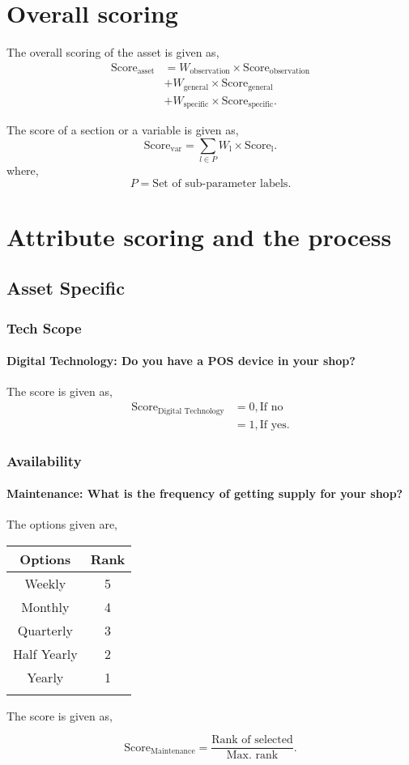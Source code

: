 \documentclass[oneside,twocolumn]{article}
\newcommand{\tsub}[2]{\text{#1}_{\text{#2}}}
\newcommand{\tsubb}[2]{#1_{\text{#2}}}
\newcommand{\dsub}[2]{\dfrac{\text{#1}}{\text{#2}}}
\newcommand{\singsel}[1]
{
	\[
		\tsub{Score}{#1} = \dsub{Rank of selected}{Max. rank}.
	\]
}
\newenvironment{ttable}
{
\begin{center}
\begin{tabular}{c|c}
\hline
}
{
\\ \hline
\end{tabular}
\end{center}
}
\begin{document}
\section{Overall scoring}
The overall scoring of the asset is given as,
\begin{align*}
	\tsub{Score}{asset} &= \tsubb{W}{observation} \times \tsub{Score}{observation} \\
	&+ \tsubb{W}{general} \times \tsub{Score}{general} \\
	&+ \tsubb{W}{specific} \times \tsub{Score}{specific}.
\end{align*}

The score of a section or a variable is given as,
\[
	\tsub{Score}{var} = \sum_{l \in P} \tsubb{W}{l} \times \tsub{Score}{l}.
\]
where,
\[
	P = \text{Set of sub-parameter labels.}
\]
\section{Attribute scoring and the
process}
\subsection{Asset Specific}
\subsubsection{Tech Scope}

\paragraph{Digital Technology: Do you have a POS device in your shop?}

The score is given as,
\begin{align*}
\tsub{Score}{Digital Technology} &= 0, \text{If no} \\
        &= 1, \text{If yes}.
\end{align*}
\subsubsection{Availability}

\paragraph{Maintenance: What is the frequency of getting supply for your shop?}

The options given are,
\begin{ttable}
Options & Rank \\ \hline
Weekly & 5 \\
Monthly & 4 \\
Quarterly & 3 \\
Half Yearly & 2 \\
Yearly & 1 \\
\hline
\end{ttable}
The score is given as,
\singsel{Maintenance}
\end{document}
